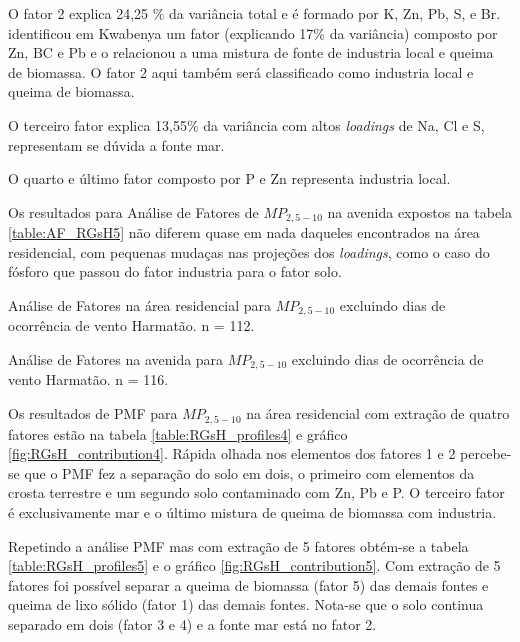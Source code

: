 O fator 2 explica 24,25 \% da variância total e é formado por K, Zn, Pb, S, e 
Br. \citet{aboh2009} identificou em Kwabenya um fator (explicando 17\% da 
variância) composto por Zn, BC e Pb e o relacionou a uma mistura de 
fonte de industria local e queima de biomassa. O fator 2 aqui também será 
classificado como industria local e queima de biomassa. 

O terceiro fator explica 13,55\% da variância com altos \textit{loadings} de 
Na, Cl e S, representam se dúvida a fonte mar. 

O quarto e último fator composto por P e Zn representa industria local. 

Os resultados para Análise de Fatores de $MP_{2,5-10}$ na avenida expostos
na tabela \ref{table:AF_RGsH5} não diferem quase em nada daqueles encontrados
na área residencial, com pequenas mudaças nas projeções dos \textit{loadings}, 
como o caso do fósforo que passou do fator industria para o fator solo. 

\newpage
\begin{table}[H]
  \centering
  
  \caption{Análise de Fatores na área residencial para $MP_{2,5-10}$
           excluindo dias de ocorrência de vento Harmatão. n = 112.
          \label{table:AF_RGsH5}}
\end{table}

\begin{table}[H]
  \centering
  
  \caption{Análise de Fatores na avenida para $MP_{2,5-10}$
           excluindo dias de ocorrência de vento Harmatão. n = 116.
          \label{table:AF_TGsH5}}
\end{table}
\newpage

Os resultados de PMF para $MP_{2,5-10}$ na área residencial com extração de 
quatro fatores estão na tabela \ref{table:RGsH_profiles4} e gráfico 
\ref{fig:RGsH_contribution4}. Rápida olhada nos elementos dos fatores 1 e 2 
percebe-se que o PMF fez a separação do solo em dois, o primeiro com elementos
da crosta terrestre e um segundo solo contaminado com Zn, Pb e P. O terceiro 
fator é exclusivamente mar e o último mistura de queima de biomassa 
com industria. 

Repetindo a análise PMF mas com extração de 5 fatores obtém-se a tabela 
\ref{table:RGsH_profiles5} e o gráfico \ref{fig:RGsH_contribution5}.
Com extração de 5 fatores foi possível separar a queima de biomassa (fator 5)
das demais fontes e queima de lixo sólido (fator 1) das demais fontes. 
Nota-se que o solo continua separado em dois (fator 3 e 4) e a fonte mar está 
no fator 2. 

